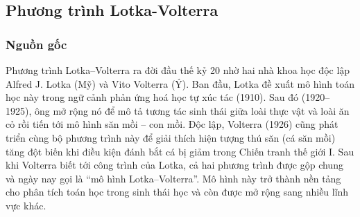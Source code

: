 \documentclass[a4paper,15pt]{article}
\begin{document}
\subsection{Phương trình Lotka-Volterra}
\subsubsection{Nguồn gốc}
Phương trình Lotka–Volterra ra đời đầu thế kỷ 20 nhờ hai nhà khoa học độc lập Alfred J. Lotka (Mỹ) và Vito Volterra (Ý). Ban đầu, Lotka đề xuất mô hình toán học này trong ngữ cảnh phản ứng hoá học tự xúc tác (1910). Sau đó (1920–1925), ông mở rộng nó để mô tả tương tác sinh thái giữa loài thực vật và loài ăn cỏ rồi tiến tới mô hình săn mồi – con mồi. Độc lập, Volterra (1926) cũng phát triển cùng bộ phương trình này để giải thích hiện tượng thú săn (cá săn mồi) tăng đột biến khi điều kiện đánh bắt cá bị giảm trong Chiến tranh thế giới I. Sau khi Volterra biết tới công trình của Lotka, cả hai phương trình được gộp chung và ngày nay gọi là “mô hình Lotka–Volterra”. Mô hình này trở thành nền tảng cho phân tích toán học trong sinh thái học và còn được mở rộng sang nhiều lĩnh vực khác.
\end{document}
